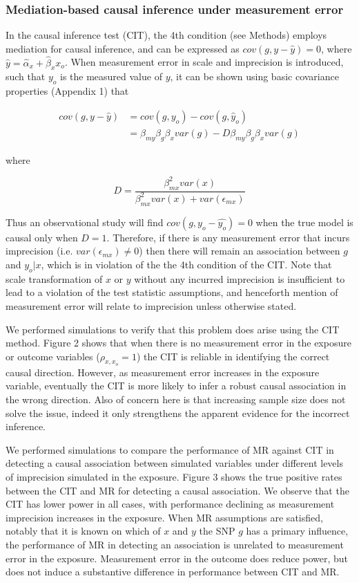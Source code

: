 \documentclass[]{article}
\begin{document}
\subsubsection{Mediation-based causal inference under measurement
error}\label{mediation-based-causal-inference-under-measurement-error}

In the causal inference test (CIT), the 4th condition (see Methods)
employs mediation for causal inference, and can be expressed as
\(cov(g, y - \hat{y}) = 0\), where
\(\hat{y} = \hat{\alpha}_x + \hat{\beta}_x x_o\). When measurement error
in scale and imprecision is introduced, such that \(y_o\) is the
measured value of \(y\), it can be shown using basic covariance
properties (Appendix 1) that

\[
\begin{aligned}
cov(g, y - \hat{y}) & = cov(g, y_o) - cov(g, \hat{y}_o)  \\
                    & = \beta_{my} \beta_g \beta_x var(g) - D \beta_{my} \beta_g \beta_x var(g)
\end{aligned}
\]

where

\[
D = \frac{\beta^2_{mx} var(x)} {\beta^2_{mx} var(x) + var(\epsilon_{mx})}
\]

Thus an observational study will find \(cov(g, y_o - \hat{y_o}) = 0\)
when the true model is causal only when \(D = 1\). Therefore, if there
is any measurement error that incurs imprecision (i.e.
\(var(\epsilon_{mx}) \neq 0\)) then there will remain an association
between \(g\) and \(y_o | x\), which is in violation of the the 4th
condition of the CIT. Note that scale transformation of \(x\) or \(y\)
without any incurred imprecision is insufficient to lead to a violation
of the test statistic assumptions, and henceforth mention of measurement
error will relate to imprecision unless otherwise stated.

We performed simulations to verify that this problem does arise using
the CIT method. Figure 2 shows that when there is no measurement error
in the exposure or outcome variables (\(\rho_{x, x_o}=1\)) the CIT is
reliable in identifying the correct causal direction. However, as
measurement error increases in the exposure variable, eventually the CIT
is more likely to infer a robust causal association in the wrong
direction. Also of concern here is that increasing sample size does not
solve the issue, indeed it only strengthens the apparent evidence for
the incorrect inference.

We performed simulations to compare the performance of MR against CIT in
detecting a causal association between simulated variables under
different levels of imprecision simulated in the exposure. Figure 3
shows the true positive rates between the CIT and MR for detecting a
causal association. We observe that the CIT has lower power in all
cases, with performance declining as measurement imprecision increases
in the exposure. When MR assumptions are satisfied, notably that it is
known on which of \(x\) and \(y\) the SNP \(g\) has a primary influence,
the performance of MR in detecting an association is unrelated to
measurement error in the exposure. Measurement error in the outcome does
reduce power, but does not induce a substantive difference in
performance between CIT and MR.
\end{document}
